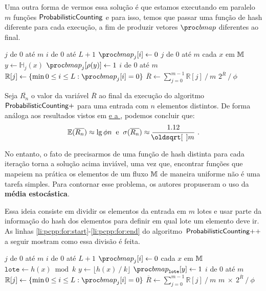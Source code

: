 Uma outra forma de vermos essa solução é que estamos executando em paralelo $m$ funções $\textsf{ProbabilisticCounting}$ e para isso, temos que 
passar uma função de hash diferente para cada execução, a fim de produzir vetores $\bitmap$ diferentes ao final.

\begin{codebox}
  \li \For $j$ de $0$ até $m$
      \Do
  \li    \For $i$ de $0$ até $L + 1$
          \Do
  \li       $\bitmap_{j}[i] \gets 0$
          \End
      \End
  \li \For $j$ de $0$ até $m$
      \Do
  \li    \For cada $x$ em $\mathbb{M}$
          \Do
  \li       $y \gets \mathbb{H}_{j}(x)$
  \li       $\bitmap_j[\rho(y)] \gets 1$
          \End
      \End
  \li \For $i$ de $0$ até $m$
      \Do
  \li    $\mathbb{R}[j] \gets \{ \min 0 \leq i \leq L: \bitmap_{j}[i] = 0 \}$
      \End
  \li $\overline{R} \gets \sum_{j=0}^{m-1} \mathbb{R}[j] \mathbin{/} m$
  \li \Return $2^{\overline{R}} \mathbin{/} \phi$
  \End
\end{codebox}

Seja $\overline{R_n}$ o valor da variável $\overline{R}$ ao final da execução do algoritmo~$\textsf{ProbabilisticCounting}{+}$ para uma
entrada com $n$ elementos distintos. De forma análoga aos resultados vistos em \hyperref[sec:morris:plus]{ 
e a }, podemos concluir que:
\[ \Ebb(\overline{R_n}) \approx \lg \phi n   \; \; \text{e}  \; \; \sigma(\overline{R_n}) \approx \frac{1.12}{\sqrt{m}} \ . \]

No entanto, o fato de precisarmos de uma função de hash distinta para cada iteração torna a solução acima inviável, uma 
vez que, encontrar funções que mapeiem na prática os elementos de um fluxo $\mathbb{M}$ de maneira uniforme não é uma 
tarefa simples. Para contornar esse problema, os autores propuseram o uso da \textbf{média estocástica}.

Essa ideia consiste em dividir os elementos da entrada em $m$ lotes e usar parte da informação do hash dos elementos para 
definir em qual lote um elemento deve ir. As linhas \ref{li:pcpp:for:start}-\ref{li:pcpp:for:end} do algoritmo~$\textsf{ProbabilisticCounting{++}}$ 
a seguir mostram como essa divisão é feita.

\begin{codebox}
  \li \For $j$ de $0$ até $m$
      \Do
  \li    \For $i$ de $0$ até $L + 1$
          \Do
  \li       $\bitmap_{j}[i] \gets 0$
          \End
      \End
  \li \For cada $x$ em $\mathbb{M}$                                                         \label{li:pcpp:for:start}
      \Do
  \li   $\texttt{lote} \gets h(x) \bmod k$
  \li   $y \gets \lfloor h(x) \mathbin{/} k \rfloor$
  \li   $\bitmap_{\texttt{lote}}[y] \gets 1$                                              \label{li:pcpp:for:end}
      \End
  \li \For $i$ de $0$ até $m$
      \Do
  \li    $\mathbb{R}[j] \gets \{ \min 0 \leq i \leq L: \bitmap_{j}[i] = 0 \}$             \label{li:pcpp:rmin}
      \End
  \li $\overline{R} \gets \sum_{j=0}^{m-1} \mathbb{R}[j] \mathbin{/} m$
  \li \Return $m \ \times \ 2^{\overline{R}} \mathbin{/} \phi$
  \End
\end{codebox}

